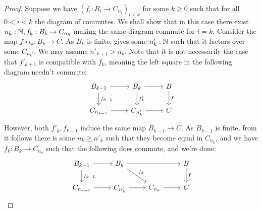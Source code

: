 \begin{proof}
  Suppose we have $(f_i: B_{i} \to C_{n_i})_{i<k}$ for some $k\geq 0$ 
  such that for all $0<i<k$ the diagram of  commutes.
  We shall show that in this case there exist $n_{k}:\mathbb{N}, f_{k}:B_k \to C_{n_k}$ 
  making the same diagram commute for $i = k$. 
  Consider the map $f\circ \iota_k: B_{k}\to C$. 
  As $B_k$ is finite,  gives some $n_k':\mathbb{N} $ such that %
  it factors over some $C_{n_k'}$.
  We may assume $n'_{k+1} > n_k$.
  Note that it is not necessarily the case that 
  $f'_{k+1}$ is compatible with $f_k$, meaning the left square in the following diagram needn't commute:
  \begin{equation}
    \begin{tikzcd}
      B_{k-1} \arrow[r] \arrow[d, "f_{k-1}"]& B_{{k}}  \arrow[r] \arrow[d,"f'_{k}"] & B \arrow[d,"f"] \\
      C_{n_{k-1}} \arrow[r] & C_{n'_{k}} \arrow[r]  & C 
    \end{tikzcd}
  \end{equation}
  However, both $f'_{k}, f_{k-1}$ induce the same map $B_{k-1} \to C$. 
  As $B_{k-1}$ is finite, from  it follows there is some $n_{k} \geq {n'_{k}}$ 
  such that they become equal in $C_{n_k}$, and we have $f_k:B_k \to C_{n_k}$ such that the following does commute, 
  and we're done:
  \begin{equation}
    \begin{tikzcd}
      B_{k-1} \arrow[d,"f_{k-1}"]\arrow[r] & B_{{k}} \arrow[rd, "f_{k}"] \arrow[rr] & & B \arrow[d,"f"] \\
      C_{n_{k-1}} \arrow[r] & C_{n'_{k}} \arrow[r] & C_{n_{k}} \arrow[r] & C 
    \end{tikzcd}
  \end{equation}
\end{proof}
